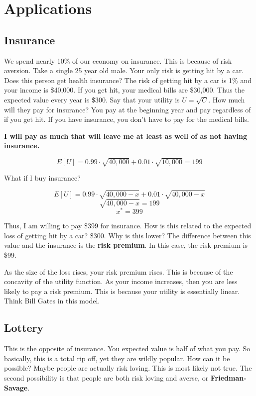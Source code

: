 \documentclass{article}
\begin{document}
\section{Applications}

\subsection{Insurance}

We spend nearly 10\% of our economy on insurance. This is because of risk
aversion. Take a single 25 year old male. Your only risk is getting hit by a
car. Does this person get health insurance? The risk of getting hit by a car is
1\% and your income is \$40,000. If you get hit, your medical bills are
\$30,000. Thus the expected value every year is \$300. Say that your utility is
$U=\sqrt{C}$. How much will they pay for insurance? You pay at the beginning
year and pay regardless of if you get hit. If you have insurance, you don't have
to pay for the medical bills. 

\textbf{I will pay as much that will leave me at least as well of as not having
insurance.}

$$E[U] = 0.99 \cdot \sqrt{40,000} + 0.01 \cdot \sqrt{10,000} = 199$$

What if I buy insurance?

$$E[U] = 0.99 \cdot \sqrt{40,000 - x} + 0.01 \cdot \sqrt{40,000 - x}$$
$$\sqrt{40,000 - x} = 199$$
$$x^* = 399$$

Thus, I am willing to pay \$399 for insurance. How is this related to the
expected loss of getting hit by a car? \$300. Why is this lower? The difference
between this value and the insurance is the \textbf{risk premium}. In this case,
the risk premium is \$99. 

As the size of the loss rises, your risk premium rises. This is because of the
concavity of the utility function. As your income increases, then you are less
likely to pay a risk premium. This is because your utility is essentially
linear. Think Bill Gates in this model.

\subsection{Lottery}

This is the opposite of insurance. You expected value is half of what you pay.
So basically, this is a total rip off, yet they are wildly popular. How can it
be possible? Maybe people are actually risk loving. This is most likely not
true. The second possibility is that people are both risk loving and averse, or
\textbf{Friedman-Savage}.
\end{document}
